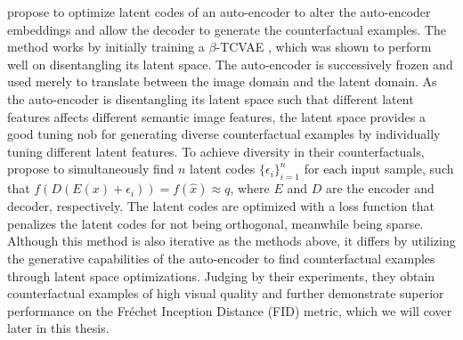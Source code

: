 \documentclass[11pt,a4paper,twoside,openright,final]{memoir}
\begin{document}
\citet{Rodriguez2021} propose to optimize latent codes of an auto-encoder to alter the auto-encoder embeddings and allow the decoder to generate the counterfactual examples.  
The method works by initially training a $\beta$-TCVAE \cite{disentangle_vae}, which was shown to perform well on disentangling its latent space.
The auto-encoder is successively frozen and used merely to translate between the image domain and the latent domain.
As the auto-encoder is disentangling its latent space such that different latent features affects different semantic image features, the latent space provides a good tuning nob for generating diverse counterfactual examples by individually tuning different latent features.
To achieve diversity in their counterfactuals, \citet{Rodriguez2021} propose to simultaneously find $n$ latent codes $\{\epsilon_i\}_{i=1}^n$ for each input sample, such that $f(D( E(x) + \epsilon_i) ) = f(\hat x) \approx q$, where $E$ and $D$ are the encoder and decoder, respectively.
The latent codes are optimized with a loss function that penalizes the latent codes for not being orthogonal, meanwhile being sparse.
Although this method is also iterative as the methods above, it differs by utilizing the generative capabilities of the auto-encoder to find counterfactual examples through latent space optimizations.
Judging by their experiments, they obtain counterfactual examples of high visual quality and further demonstrate superior performance on the Fr\'echet Inception Distance (FID) metric, which we will cover later in this thesis.
\end{document}

